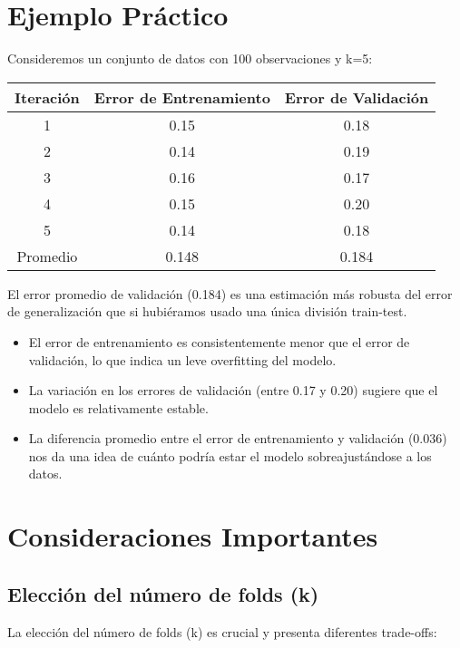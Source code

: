 \documentclass[12pt]{article}
\begin{document}
\section{Ejemplo Práctico}
Consideremos un conjunto de datos con 100 observaciones y k=5:

\begin{table}[H]
    \centering
    \begin{tabular}{ccc}
        \toprule
        Iteración & Error de Entrenamiento & Error de Validación \\
        \midrule
        1 & 0.15 & 0.18 \\
        2 & 0.14 & 0.19 \\
        3 & 0.16 & 0.17 \\
        4 & 0.15 & 0.20 \\
        5 & 0.14 & 0.18 \\
        \midrule
        Promedio & 0.148 & 0.184 \\
        \bottomrule
    \end{tabular}
\end{table}

El error promedio de validación (0.184) es una estimación más robusta del error de generalización que si hubiéramos usado una única división train-test.

\begin{itemize}
    \item El error de entrenamiento es consistentemente menor que el error de validación, lo que indica un leve overfitting del modelo.
    \item La variación en los errores de validación (entre 0.17 y 0.20) sugiere que el modelo es relativamente estable.
    \item La diferencia promedio entre el error de entrenamiento y validación (0.036) nos da una idea de cuánto podría estar el modelo sobreajustándose a los datos.
\end{itemize}

\section{Consideraciones Importantes}
\subsection{Elección del número de folds (k)}
La elección del número de folds (k) es crucial y presenta diferentes trade-offs:
\end{document}
